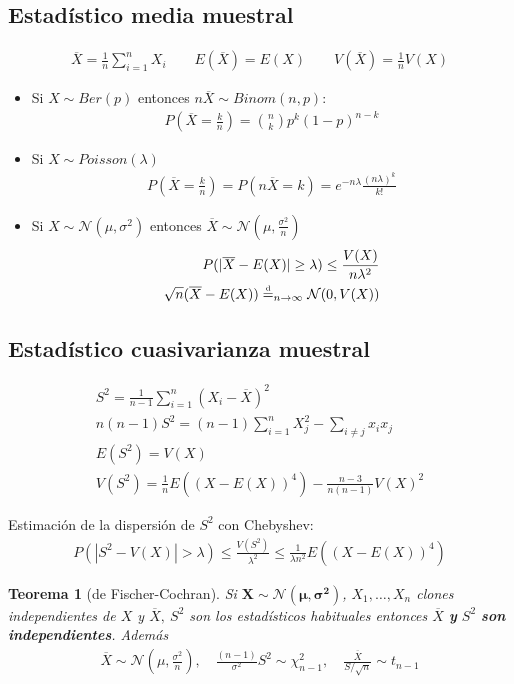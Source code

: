 \documentclass[a4paper,twocolumn]{extarticle}
\newtheorem*{thm}{Teorema}
\theoremstyle{remark}
\newcommand\deq{\mathrel{\overset{\makebox[0pt]{\mbox{\normalfont\tiny d}}}{=}}}
\newcommand{\Xbarra}{\overline{X}}
\newcommand{\normal}{\mathcal{N}}
\begin{document}
\subsection{Estadístico media muestral}

\begin{align*}
	\Xbarra = \frac{1}{n}\sum_{i=1}^n X_i\qquad
	E(\Xbarra) = E(X)\qquad
	V(\Xbarra) = \frac{1}{n}V(X)
\end{align*}
\begin{itemize}
	\item Si $X \sim Ber(p)$ entonces $n\Xbarra \sim Binom(n,p)$:
	\begin{align*}
		P(\Xbarra = \frac{k}{n}) = \binom{n}{k}p^k(1-p)^{n-k}
	\end{align*}
	\item Si $X \sim Poisson(\lambda)$
	\begin{align*}
		P(\Xbarra = \frac{k}{n}) = P(n\Xbarra = k) = e^{-n\lambda}\frac{(n\lambda)^k}{k!}
	\end{align*}
	\item Si $X \sim \normal(\mu, \sigma^2)$ entonces $\Xbarra \sim \normal(\mu, \frac{\sigma^2}{n})$
	\begin{align*}
		P(|\Xbarra - E(X)| \geq \lambda) \leq \frac{V(X)}{n\lambda^2} \\
		\sqrt{n}(\Xbarra - E(X)) \deq_{n\to \infty} \normal(0, V(X))
	\end{align*}
\end{itemize}

\subsection{Estadístico cuasivarianza muestral}
\begin{align*}
	S^2 = \frac{1}{n-1}\sum_{i=1}^{n}(X_i - \Xbarra)^2 \\
	n(n-1)S^2 = (n-1)\sum_{i=1}^{n} X_j^2 - \sum_{i\neq j} x_i x_j \\
	E(S^2) = V(X) \\
	V(S^2) = \frac{1}{n}E((X - E(X))^4) - \frac{n-3}{n(n-1)}V(X)^2
\end{align*}

Estimación de la dispersión de $S^2$ con Chebyshev:
\begin{align*}
	P(|S^2-V(X)| > \lambda) \leq \frac{V(S^2)}{\lambda^2} \leq \frac{1}{\lambda n^2}E((X-E(X))^4)
\end{align*}

\begin{thm}[de Fischer-Cochran]
	Si $\mathbf{X \sim \normal(\mu,\sigma^2)}$, $X_1, \dots, X_n$ clones independientes de $X$ y $\Xbarra,\ S^2$ son los estadísticos habituales entonces $\Xbarra$ \textbf{y} $S^2$ \textbf{son independientes}. Además
	\begin{align*}
		\Xbarra \sim \normal(\mu, \frac{\sigma^2}{n}),\quad \frac{(n-1)}{\sigma^2}S^2 \sim \chi^2_{n-1}, \quad \frac{\Xbarra}{S/\sqrt{n}} \sim t_{n-1}
	\end{align*}
\end{thm}
\end{document}
